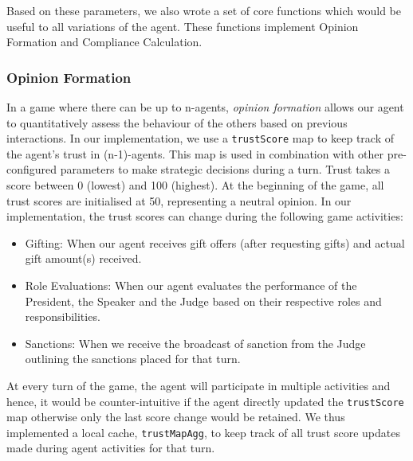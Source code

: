 \documentclass{article}
\begin{document}
Based on these parameters, we also wrote a set of core functions which would be useful to all variations of the agent. These functions implement Opinion Formation and Compliance Calculation.


\subsubsection*{Opinion Formation} \label{section_opinion_formation}
In a game where there can be up to n-agents, \textit{opinion formation} allows our agent to quantitatively assess the behaviour of the others based on previous interactions. %
In our implementation, we use a \texttt{trustScore} map to keep track of the agent's trust in (n-1)-agents. This map is used in combination with other pre-configured parameters to make strategic decisions during a turn. 
Trust takes a score between 0 (lowest) and 100 (highest). At the beginning of the game, all trust scores are initialised at 50, representing a neutral opinion. In our implementation, the trust scores can change during the following game activities:

\begin{itemize}
    \item Gifting: When our agent receives gift offers (after requesting gifts) and actual gift amount(s) received.
    \item Role Evaluations: When our agent evaluates the performance of the President, the Speaker and the Judge based on their respective roles and responsibilities.
    \item Sanctions: When we receive the broadcast of sanction from the Judge outlining the sanctions placed for that turn.
\end{itemize}


At every turn of the game, the agent will participate in multiple activities and hence, it would be counter-intuitive if the agent directly updated the \texttt{trustScore} map otherwise only the last score change would be retained. We thus implemented a local cache, \texttt{trustMapAgg}, to keep track of all trust score updates made during agent activities for that turn. 
\end{document}
